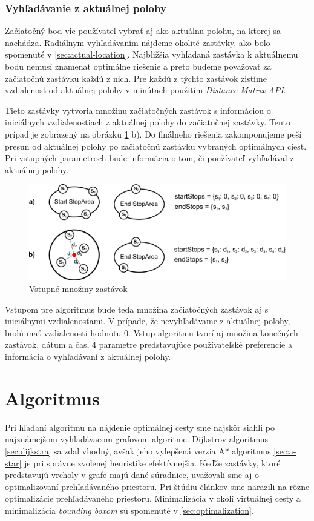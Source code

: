\subsubsection{Vyhľadávanie z aktuálnej polohy}
Začiatočný bod vie používateľ vybrať aj ako aktuálnu polohu, na ktorej sa nachádza. Radiálnym vyhľadávaním nájdeme okolité zastávky, ako bolo spomenuté v \ref{sec:actual-location}. Najbližšia vyhľadaná zastávka k aktuálnemu bodu nemusí znamenať optimálne riešenie a preto budeme považovať za začiatočnú zastávku každú z nich. Pre každú z týchto zastávok zistíme vzdialenosť od aktuálnej polohy  v minútach použitím \textit{Distance Matrix API}. 

Tieto zastávky vytvoria množinu začiatočných zastávok s informáciou o iniciálnych vzdialenostiach z aktuálnej polohy do začiatočnej zastávky. Tento prípad je zobrazený na obrázku \ref{fig:initial-parameters} b). Do finálneho riešenia zakomponujeme peší presun od aktuálnej polohy po začiatočnú zastávku vybraných optimálnych ciest. Pri vstupných parametroch bude informácia o tom, či používateľ vyhľadával z aktuálnej polohy.

\begin{figure}[H]
\centerline{\includegraphics[width=1.0\textwidth]{images/initial-parameters}}
\caption[Vstupné množiny zastávok]{Vstupné množiny zastávok}
\label{fig:initial-parameters}
\end{figure} 

Vstupom pre algoritmus bude teda množina začiatočných zastávok aj s iniciálnymi vzdialenosťami. V prípade, že nevyhľadávame z aktuálnej polohy, budú mať vzdialenosti hodnotu 0. Vstup algoritmu tvorí aj množina konečných zastávok, dátum a čas, 4 parametre predstavujúce používateľské preferencie a informácia o vyhľadávaní z aktuálnej polohy.

\section{Algoritmus}
Pri hľadaní algoritmu na nájdenie optimálnej cesty sme najskôr siahli po najznámejšom vyhľadávacom grafovom algoritme. Dijkstrov algoritmus \ref{sec:dijkstra} sa zdal vhodný, avšak jeho vylepšená verzia A* algoritmus \ref{sec:a-star} je pri správne zvolenej heuristike efektívnejšia. Keďže zastávky, ktoré predstavujú vrcholy v grafe majú dané súradnice, uvažovali sme aj o optimalizovaní prehľadávaného priestoru. Pri štúdiu článkov sme narazili na rôzne optimalizácie prehľadávaného priestoru. Minimalizácia v okolí virtuálnej cesty a minimalizácia \textit{bounding boxom} sú spomenuté v \ref{sec:optimalization}.

